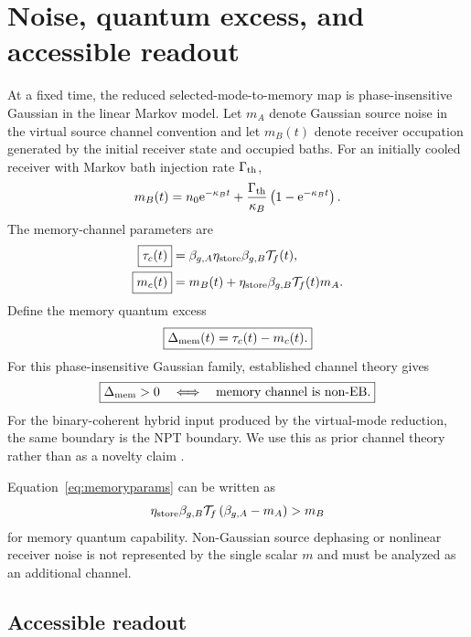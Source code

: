 \section{Noise, quantum excess, and accessible readout}
\label{sec:noise}

At a fixed time, the reduced selected-mode-to-memory map is phase-insensitive Gaussian in the linear Markov model. Let $m_A$ denote Gaussian source noise in the virtual source channel convention and let $m_B(t)$ denote receiver occupation generated by the initial receiver state and occupied baths. For an initially cooled receiver with Markov bath injection rate $\Gamma_{\rm th}$,
\begin{equation}
m_B(t)=n_0\mathrm{e}^{-\kappa_B t}
+\frac{\Gamma_{\rm th}}{\kappa_B}
\left(1-\mathrm{e}^{-\kappa_B t}\right).
\label{eq:mB}
\end{equation}
The memory-channel parameters are
\begin{align}
\boxed{\tau_c(t)}&=\beta_{g,A}\eta_{\rm store}\beta_{g,B}\mathcal T_f(t),\\
\boxed{m_c(t)}&=m_B(t)
+\eta_{\rm store}\beta_{g,B}\mathcal T_f(t)m_A.
\label{eq:memoryparams}
\end{align}
Define the memory quantum excess
\begin{equation}
\boxed{\Delta_{\rm mem}(t)=\tau_c(t)-m_c(t).}
\label{eq:Dmem}
\end{equation}
For this phase-insensitive Gaussian family, established channel theory gives
\begin{equation}
\boxed{\Delta_{\rm mem}>0\quad\Longleftrightarrow\quad\text{memory channel is non-EB}.}
\label{eq:memnonEB}
\end{equation}
For the binary-coherent hybrid input produced by the virtual-mode reduction, the same boundary is the NPT boundary. We use this as prior channel theory rather than as a novelty claim \cite{Holevo2008EB,FilippovZiman2014}.

Equation~\eqref{eq:memoryparams} can be written as
\begin{equation}
\eta_{\rm store}\beta_{g,B}\mathcal T_f
\left(\beta_{g,A}-m_A\right)>m_B
\label{eq:memcondition}
\end{equation}
for memory quantum capability. Non-Gaussian source dephasing or nonlinear receiver noise is not represented by the single scalar $m$ and must be analyzed as an additional channel.

\subsection{Accessible readout}

